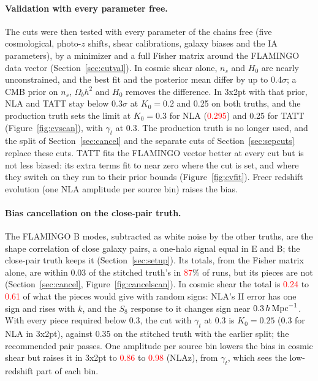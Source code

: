 \documentclass[11pt]{article}
\newcommand{\hMpc}{\,h\,{\rm Mpc}^{-1}}
\newif\ifnumbersfinal
\newcommand{\refresh}[1]{\ifnumbersfinal#1\else\textcolor{red}{#1}\fi}
\newcommand{\CVNLAprodThree}{\refresh{0.295}}
\newcommand{\CPvsSOneFrac}{\refresh{87}}
\newcommand{\CPcancCSLo}{\refresh{0.24}}
\newcommand{\CPcancCSHi}{\refresh{0.61}}
\newcommand{\CPzNLAzLo}{\refresh{0.86}}
\newcommand{\CPzNLAzHi}{\refresh{0.98}}
\newcommand{\Tol}{0.3}
\begin{document}
\paragraph{Validation with every parameter free.}
The cuts were then tested with every parameter of the chains free (five
cosmological, photo-$z$ shifts, shear calibrations, galaxy biases and the
IA parameters), by a minimizer and a full Fisher matrix around the
FLAMINGO data vector (Section~\ref{sec:cutval}). In cosmic shear alone,
$n_s$ and $H_0$ are nearly unconstrained, and the best fit and the
posterior mean differ by up to 0.4$\sigma$; a CMB prior on $n_s$,
$\Omega_b h^2$ and $H_0$ removes the difference. In 3x2pt with that prior,
NLA and TATT stay below \Tol$\sigma$ at $K_0 = 0.2$ and 0.25 on both
truths, and the production truth sets the limit at $K_0 = 0.3$ for NLA
(\CVNLAprodThree) and 0.25 for TATT (Figure~\ref{fig:cvscan}), with
$\gamma_t$ at 0.3. The production truth is no longer used, and the split of
Section~\ref{sec:cancel} and the separate cuts of Section~\ref{sec:sepcuts}
replace these cuts. TATT fits
the FLAMINGO vector better at every cut but is not less biased: its extra
terms fit to near zero where the cut is set, and where they switch on they
run to their prior bounds (Figure~\ref{fig:cvfit}). Freer redshift
evolution (one NLA amplitude per source bin) raises the bias.

\paragraph{Bias cancellation on the close-pair truth.}
The FLAMINGO B modes, subtracted as white noise by the other truths, are the
shape correlation of close galaxy pairs, a one-halo signal equal in E and B;
the close-pair truth keeps it (Section~\ref{sec:setup}). Its totals, from the
Fisher matrix alone, are within 0.03 of the stitched truth's in
\CPvsSOneFrac\% of runs, but its pieces are not (Section~\ref{sec:cancel},
Figure~\ref{fig:cancelscan}). In cosmic shear the total is
\CPcancCSLo{} to \CPcancCSHi{} of what the pieces would give with random
signs: NLA's II error has one sign and rises with $k$, and the $S_8$
response to it changes sign near $0.3\hMpc$. With every piece required below
\Tol, the cut with $\gamma_t$ at 0.3 is $K_0 = 0.25$ (0.3 for NLA in
3x2pt), against 0.35 on the stitched truth with the earlier split; the
recommended pair passes. One amplitude per source bin lowers the bias in
cosmic shear but raises it in 3x2pt to \CPzNLAzLo{} to \CPzNLAzHi{} (NLAz),
from $\gamma_t$, which sees the low-redshift part of each bin.
\end{document}
